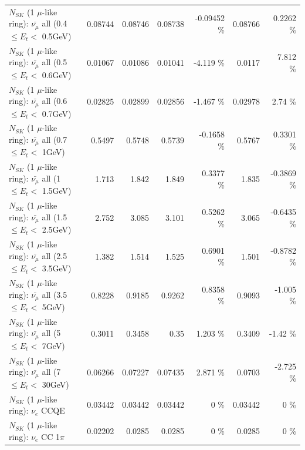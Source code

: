 \begin{table}
\begin{tabular}{| l | r | r | r  r | r  r |}
 $N_{SK}$ (1 $\mu$-like ring): $\bar{\nu_{\mu}}$ all (0.4 $\leq E_{t} <$ 0.5GeV) &         0.08744 &         0.08746 &         0.08738 & -0.09452 \%  &         0.08766 &   0.2262 \%  \\ 
 $N_{SK}$ (1 $\mu$-like ring): $\bar{\nu_{\mu}}$ all (0.5 $\leq E_{t} <$ 0.6GeV) &         0.01067 &         0.01086 &         0.01041 &   -4.119 \%  &          0.0117 &    7.812 \%  \\ 
 $N_{SK}$ (1 $\mu$-like ring): $\bar{\nu_{\mu}}$ all (0.6 $\leq E_{t} <$ 0.7GeV) &         0.02825 &         0.02899 &         0.02856 &   -1.467 \%  &         0.02978 &     2.74 \%  \\ 
   $N_{SK}$ (1 $\mu$-like ring): $\bar{\nu_{\mu}}$ all (0.7 $\leq E_{t} <$ 1GeV) &          0.5497 &          0.5748 &          0.5739 &  -0.1658 \%  &          0.5767 &   0.3301 \%  \\ 
   $N_{SK}$ (1 $\mu$-like ring): $\bar{\nu_{\mu}}$ all (1 $\leq E_{t} <$ 1.5GeV) &           1.713 &           1.842 &           1.849 &   0.3377 \%  &           1.835 &  -0.3869 \%  \\ 
 $N_{SK}$ (1 $\mu$-like ring): $\bar{\nu_{\mu}}$ all (1.5 $\leq E_{t} <$ 2.5GeV) &           2.752 &           3.085 &           3.101 &   0.5262 \%  &           3.065 &  -0.6435 \%  \\ 
 $N_{SK}$ (1 $\mu$-like ring): $\bar{\nu_{\mu}}$ all (2.5 $\leq E_{t} <$ 3.5GeV) &           1.382 &           1.514 &           1.525 &   0.6901 \%  &           1.501 &  -0.8782 \%  \\ 
   $N_{SK}$ (1 $\mu$-like ring): $\bar{\nu_{\mu}}$ all (3.5 $\leq E_{t} <$ 5GeV) &          0.8228 &          0.9185 &          0.9262 &   0.8358 \%  &          0.9093 &   -1.005 \%  \\ 
     $N_{SK}$ (1 $\mu$-like ring): $\bar{\nu_{\mu}}$ all (5 $\leq E_{t} <$ 7GeV) &          0.3011 &          0.3458 &            0.35 &    1.203 \%  &          0.3409 &    -1.42 \%  \\ 
    $N_{SK}$ (1 $\mu$-like ring): $\bar{\nu_{\mu}}$ all (7 $\leq E_{t} <$ 30GeV) &         0.06266 &         0.07227 &         0.07435 &    2.871 \%  &          0.0703 &   -2.725 \%  \\ 
\hline
\hline
\hline
                                      $N_{SK}$ (1 $\mu$-like ring): $\nu_e$ CCQE &         0.03442 &         0.03442 &         0.03442 &        0 \%  &         0.03442 &        0 \%  \\ 
                                 $N_{SK}$ (1 $\mu$-like ring): $\nu_e$ CC 1$\pi$ &         0.02202 &          0.0285 &          0.0285 &        0 \%  &          0.0285 &        0 \%  \\ 

\end{tabular}
\end{table}
